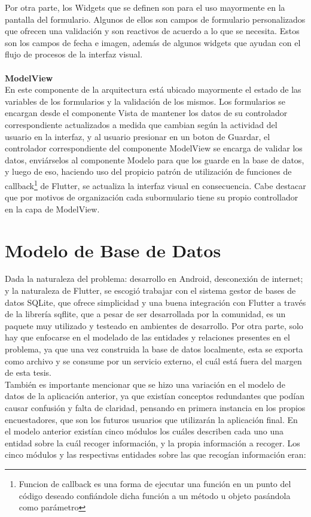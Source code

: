 Por otra parte, los Widgets que se definen son para el uso mayormente en la pantalla del formulario. Algunos de ellos son campos de formulario personalizados que
ofrecen una validación y son reactivos de acuerdo a lo que se necesita. Estos son los campos de fecha e imagen, además de algunos widgets que ayudan con el flujo
de procesos de la interfaz visual.
\\\\
\textbf{ModelView}\\
En este componente de la arquitectura está ubicado mayormente el estado de las variables de los formularios y la validación de los mismos. Los formularios se encargan
desde el componente Vista de mantener los datos de su controlador correspondiente actualizados a medida que cambian según la actividad del usuario en la interfaz,
y al usuario presionar en un boton de Guardar, el controlador correspondiente del componente ModelView se encarga de validar los datos, enviárselos al componente Modelo
para que los guarde en la base de datos, y luego de eso, haciendo uso del propicio patrón de utilización de funciones de callback\footnote{Funcion de callback es una
    forma de ejecutar una función en un punto del código deseado confiándole dicha función a un método u objeto pasándola como parámetro} de Flutter, se actualiza la interfaz
visual en consecuencia. Cabe destacar que por motivos de organización cada subormulario tiene su propio controllador en la capa de ModelView.
\\
\section{Modelo de Base de Datos} \label{section:dataModel}
Dada la naturaleza del problema: desarrollo en Android, desconexión de internet; y la naturaleza de Flutter, se escogió trabajar con el sistema gestor de bases de datos SQLite,
que ofrece simplicidad y una buena integración con Flutter a través de la librería sqflite, que a pesar de ser desarrollada por la comunidad, es un paquete muy utilizado y
testeado en ambientes de desarrollo. Por otra parte, solo hay que enfocarse en el modelado de las entidades y relaciones presentes en el problema, ya que una vez construida
la base de datos localmente, esta se exporta como archivo y se consume por un servicio externo, el cuál está fuera del margen de esta tesis.\\
También es importante mencionar que se hizo una variación en el modelo de datos de la aplicación anterior, ya que existían conceptos redundantes que podían causar confusión y
falta de claridad, pensando en primera instancia en los propios encuestadores, que son los futuros usuarios que utilizarán la aplicación final. En el modelo anterior existían
cinco módulos los cuáles describen cada uno una entidad sobre la cuál recoger información, y la propia información a recoger. Los cinco módulos y las respectivas entidades sobre
las que recogían información eran:

